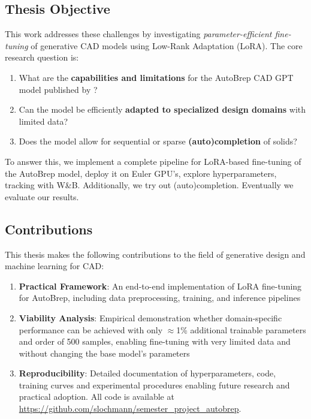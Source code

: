 \subsection{Thesis Objective}

This work addresses these challenges by investigating \textit{parameter-efficient fine-tuning} of generative CAD models using Low-Rank Adaptation (LoRA). The core research question is:

\par

\begin{enumerate}
    \item What are the \textbf{capabilities and limitations} for the AutoBrep CAD GPT model published by \cite{Xu2025autobrep}?
    \item Can the model be efficiently \textbf{adapted to specialized design domains} with limited data?
    \item Does the model allow for sequential or sparse \textbf{(auto)completion} of solids?
\end{enumerate}

To answer this, we implement a complete pipeline for LoRA-based fine-tuning of the AutoBrep model, deploy it on Euler GPU's, explore hyperparameters, tracking with W\&B. Additionally, we try out (auto)completion. Eventually we evaluate our results.

\subsection{Contributions}

This thesis makes the following contributions to the field of generative design and machine learning for CAD:

\par

\begin{enumerate}
    \item \textbf{Practical Framework}: An end-to-end implementation of LoRA fine-tuning for AutoBrep, including data preprocessing, training, and inference pipelines

    \item \textbf{Viability Analysis}: Empirical demonstration whether domain-specific performance can be achieved with only $\approx$1\% additional trainable parameters and order of 500 samples, enabling fine-tuning with very limited data and without changing the base model's parameters

    \item \textbf{Reproducibility}: Detailed documentation of hyperparameters, code, training curves and experimental procedures enabling future research and practical adoption. All code is available at \url{https://github.com/slochmann/semester_project_autobrep}.
\end{enumerate}

